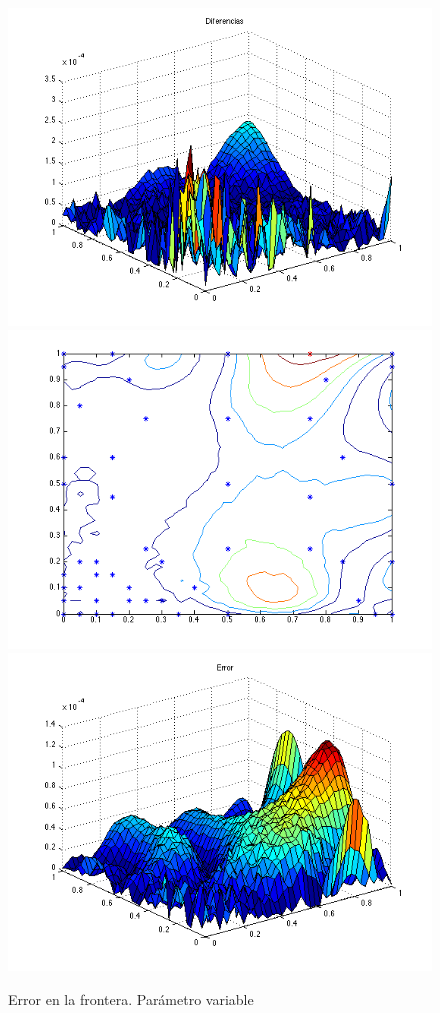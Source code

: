 \documentclass[11pt,a4paper]{article}
\begin{document}
\begin{figure}

\includegraphics[scale=.27]{diferencias4_3.png}
\includegraphics[scale=.27]{centros4_3.png}
\includegraphics[scale=.27]{error4_3.png}
\caption{Error en la frontera. Parámetro variable}
\end{figure}
\end{document}
